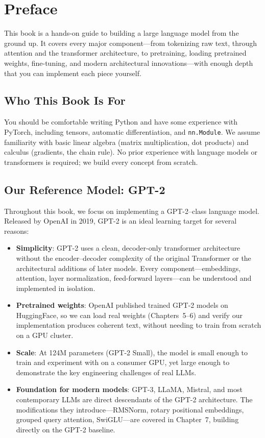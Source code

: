 \chapter*{Preface}

This book is a hands-on guide to building a large language model from the ground up.
It covers every major component---from tokenizing raw text, through attention and the
transformer architecture, to pretraining, loading pretrained weights, fine-tuning,
and modern architectural innovations---with enough depth that you can implement each
piece yourself.

\section*{Who This Book Is For}

You should be comfortable writing Python and have some experience with PyTorch,
including tensors, automatic differentiation, and \texttt{nn.Module}.
We assume familiarity with basic linear algebra (matrix multiplication, dot products)
and calculus (gradients, the chain rule). No prior experience with language models
or transformers is required; we build every concept from scratch.

\section*{Our Reference Model: GPT-2}

Throughout this book, we focus on implementing a GPT-2--class language model.
Released by OpenAI in 2019, GPT-2 is an ideal learning target for several
reasons:

\begin{itemize}
    \item \textbf{Simplicity}: GPT-2 uses a clean, decoder-only transformer
          architecture without the encoder--decoder complexity of the original
          Transformer or the architectural additions of later models. Every
          component---embeddings, attention, layer normalization, feed-forward
          layers---can be understood and implemented in isolation.
    \item \textbf{Pretrained weights}: OpenAI published trained GPT-2 models on
          HuggingFace, so we can load real weights (Chapters~5--6) and verify
          our implementation produces coherent text, without needing to train
          from scratch on a GPU cluster.
    \item \textbf{Scale}: At 124M parameters (GPT-2 Small), the model is small
          enough to train and experiment with on a consumer GPU, yet large
          enough to demonstrate the key engineering challenges of real LLMs.
    \item \textbf{Foundation for modern models}: GPT-3, LLaMA, Mistral, and
          most contemporary LLMs are direct descendants of the GPT-2
          architecture. The modifications they introduce---RMSNorm, rotary
          positional embeddings, grouped query attention, SwiGLU---are covered
          in Chapter~7, building directly on the GPT-2 baseline.
\end{itemize}

